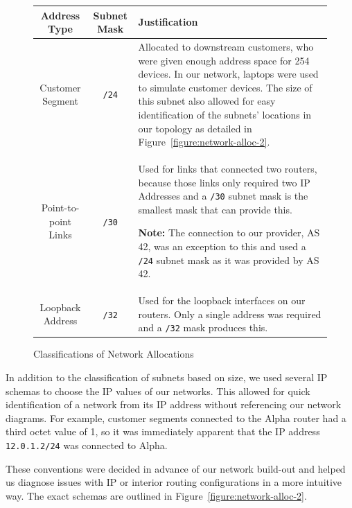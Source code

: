 \begin{figure}[!ht]
    \caption{Classifications of Network Allocations}
    \label{figure:network-alloc-1}
    \centering
    \begin{tabular}{|c|c|p{5.5cm}|}

        \hline
        \textbf{Address Type} & \textbf{Subnet Mask} & \textbf{Justification} \\

        \hline
        Customer Segment & \texttt{/24} & Allocated to downstream customers,
        who were given enough address space for 254 devices. In our network,
        laptops were used to simulate customer devices. The size of this subnet
        also allowed for easy identification of the subnets' locations in our
        topology as detailed in Figure~\ref{figure:network-alloc-2}.\\

        \hline
        Point-to-point Links & \texttt{/30} & Used for links that connected two
        routers, because those links only required two IP Addresses and a
        \texttt{/30} subnet mask is the smallest mask that can provide this.

        \textbf{Note:} The connection to our provider, AS 42, was an exception
        to this and used a \texttt{/24} subnet mask as it was provided by AS 42.\\

        \hline
        Loopback Address & \texttt{/32} & Used for the loopback interfaces on
        our routers. Only a single address was required and a \texttt{/32} mask
        produces this.\\

        \hline
    \end{tabular}
\end{figure}
In addition to the classification of subnets based on size, we used several IP
schemas to choose the IP values of our networks. This allowed for quick
identification of a network from its IP address without referencing our network
diagrams. For example, customer segments connected to the Alpha router had a
third octet value of 1, so it was immediately apparent that the IP address
\texttt{12.0.1.2/24} was connected to Alpha.

These conventions were decided in advance of our network build-out and helped
us diagnose issues with IP or interior routing configurations in a more
intuitive way. The exact schemas are outlined in Figure~\ref{figure:network-alloc-2}.


